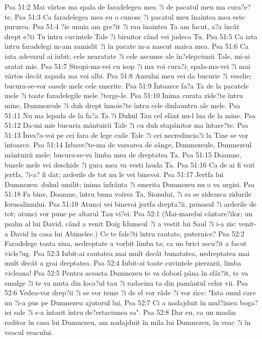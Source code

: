 Psa 51:2  Mai vârtos ma spala de faradelegea mea ?i de pacatul meu ma cura?e?te.
Psa 51:3  Ca faradelegea mea eu o cunosc ?i pacatul meu înaintea mea este pururea.
Psa 51:4  ?ie unuia am gre?it ?i rau înaintea Ta am facut, a?a încât drept e?ti Tu întru cuvintele Tale ?i biruitor când vei judeca Tu.
Psa 51:5  Ca iata întru faradelegi m-am zamislit ?i în pacate m-a nascut maica mea.
Psa 51:6  Ca iata adevarul ai iubit; cele nearatate ?i cele ascunse ale în?elepciunii Tale, mi-ai aratat mie.
Psa 51:7  Stropi-ma-vei cu isop ?i ma voi cura?i; spala-ma-vei ?i mai vârtos decât zapada ma voi albi.
Psa 51:8  Auzului meu vei da bucurie ?i veselie; bucura-se-vor oasele mele cele smerite.
Psa 51:9  Întoarce fa?a Ta de la pacatele mele ?i toate faradelegile mele ?terge-le.
Psa 51:10  Inima curata zide?te întru mine, Dumnezeule ?i duh drept înnoie?te întru cele dinlauntru ale mele.
Psa 51:11  Nu ma lepada de la fa?a Ta ?i Duhul Tau cel sfânt nu-l lua de la mine.
Psa 51:12  Da-mi mie bucuria mântuirii Tale ?i cu duh stapânitor ma întare?te.
Psa 51:13  Înva?a-voi pe cei fara de lege caile Tale ?i cei necredincio?i la Tine se vor întoarce.
Psa 51:14  Izbave?te-ma de varsarea de sânge, Dumnezeule, Dumnezeul mântuirii mele; bucura-se-va limba mea de dreptatea Ta.
Psa 51:15  Doamne, buzele mele vei deschide ?i gura mea va vesti lauda Ta.
Psa 51:16  Ca de ai fi voit jertfa, ?i-a? fi dat; arderile de tot nu le vei binevoi.
Psa 51:17  Jertfa lui Dumnezeu: duhul umilit; inima înfrânta ?i smerita Dumnezeu nu o va urgisi.
Psa 51:18  Fa bine, Doamne, întru buna voirea Ta, Sionului, ?i sa se zideasca zidurile Ierusalimului.
Psa 51:19  Atunci vei binevoi jertfa drepta?ii, prinosul ?i arderile de tot; atunci vor pune pe altarul Tau vi?ei.
Psa 52:1  (Mai-marelui cântare?ilor; un psalm al lui David, când a venit Doig Idumeul ?i a vestit lui Saul ?i i-a zis: venit-a David în casa lui Abimelec.) Ce te fale?ti întru rautate, puternice?
Psa 52:2  Faradelege toata ziua, nedreptate a vorbit limba ta; ca un brici ascu?it a facut vicle?ug.
Psa 52:3  Iubit-ai rautatea mai mult decât bunatatea, nedreptatea mai mult decât a grai dreptatea.
Psa 52:4  Iubit-ai toate cuvintele pierzarii, limba vicleana!
Psa 52:5  Pentru aceasta Dumnezeu te va doborî pâna în sfâr?it, te va smulge ?i te va muta din loca?ul tau ?i radacina ta din pamântul celor vii.
Psa 52:6  Vedea-vor drep?ii ?i se vor teme ?i de el vor râde ?i vor zice: "Iata omul care nu ?i-a pus pe Dumnezeu ajutorul lui,
Psa 52:7  Ci a nadajduit în mul?imea boga?iei sale ?i s-a întarit întru de?ertaciunea sa".
Psa 52:8  Dar eu, ca un maslin roditor în casa lui Dumnezeu, am nadajduit în mila lui Dumnezeu, în veac ?i în veacul veacului.
